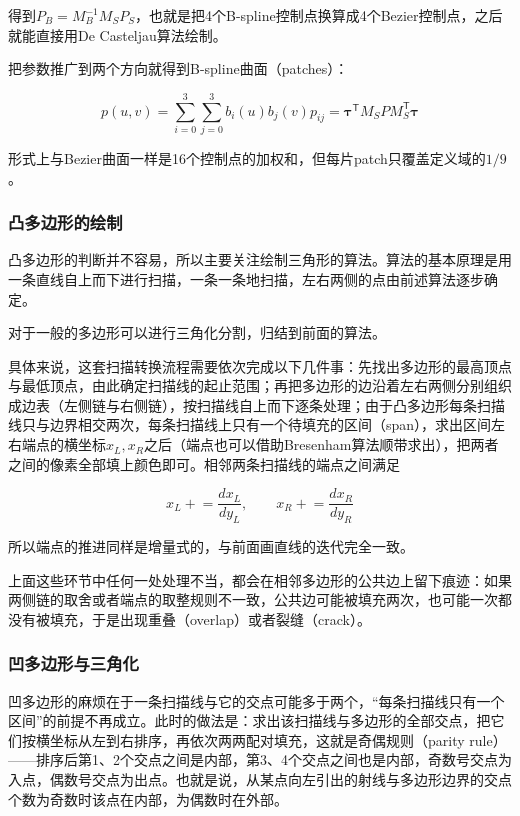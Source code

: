 得到$P_B = M_B^{-1}M_SP_S$，也就是把4个B-spline控制点换算成4个Bezier控制点，之后就能直接用De Casteljau算法绘制。

把参数推广到两个方向就得到B-spline曲面（patches）：

\[
p(u,v) = \sum_{i=0}^{3}\sum_{j=0}^{3}b_i(u)b_j(v)p_{ij} = \boldsymbol\tau^{\mathsf T}M_SPM_S^{\mathsf T}\boldsymbol\tau
\]

形式上与Bezier曲面一样是16个控制点的加权和，但每片patch只覆盖定义域的$1/9$。

\subsubsection{凸多边形的绘制}

凸多边形的判断并不容易，所以主要关注绘制三角形的算法。算法的基本原理是用一条直线自上而下进行扫描，一条一条地扫描，左右两侧的点由前述算法逐步确定。

对于一般的多边形可以进行三角化分割，归结到前面的算法。

具体来说，这套扫描转换流程需要依次完成以下几件事：先找出多边形的最高顶点与最低顶点，由此确定扫描线的起止范围；再把多边形的边沿着左右两侧分别组织成边表（左侧链与右侧链），按扫描线自上而下逐条处理；由于凸多边形每条扫描线只与边界相交两次，每条扫描线上只有一个待填充的区间（span），求出区间左右端点的横坐标$x_L, x_R$之后（端点也可以借助Bresenham算法顺带求出），把两者之间的像素全部填上颜色即可。相邻两条扫描线的端点之间满足

\[
x_L \mathrel{+}= \frac{dx_L}{dy_L}, \qquad x_R \mathrel{+}= \frac{dx_R}{dy_R}
\]

所以端点的推进同样是增量式的，与前面画直线的迭代完全一致。

上面这些环节中任何一处处理不当，都会在相邻多边形的公共边上留下痕迹：如果两侧链的取舍或者端点的取整规则不一致，公共边可能被填充两次，也可能一次都没有被填充，于是出现重叠（overlap）或者裂缝（crack）。

\subsubsection{凹多边形与三角化}

凹多边形的麻烦在于一条扫描线与它的交点可能多于两个，“每条扫描线只有一个区间”的前提不再成立。此时的做法是：求出该扫描线与多边形的全部交点，把它们按横坐标从左到右排序，再依次两两配对填充，这就是奇偶规则（parity rule）——排序后第1、2个交点之间是内部，第3、4个交点之间也是内部，奇数号交点为入点，偶数号交点为出点。也就是说，从某点向左引出的射线与多边形边界的交点个数为奇数时该点在内部，为偶数时在外部。

